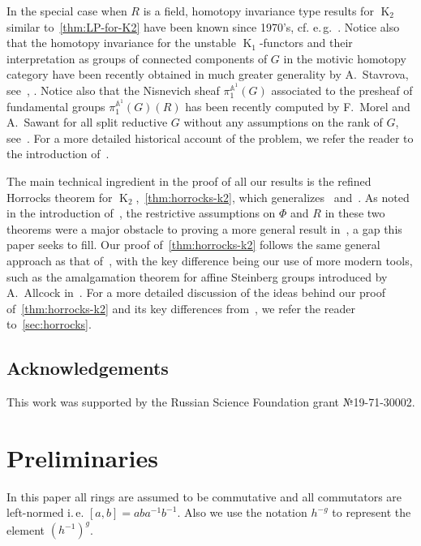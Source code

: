 \documentclass[oneside, 10pt]{amsart}
\DeclareMathOperator{\K}{K}
\numberwithin{equation}{section}
\numberwithin{thm}{section}
\numberwithin{lemma}{section}
\theoremstyle{definition}
\theoremstyle{remark}
\begin{document}
In the special case when $R$ is a field, homotopy invariance type results for $\K_2$ similar to~\cref{thm:LP-for-K2} have been known since 1970's, cf. e.\,g.~\cite{Hur77, Re75, VW16}.
Notice also that the homotopy invariance for the unstable $\K_1$-functors and their interpretation as groups of connected components of $G$ in the motivic homotopy category
have been recently obtained in much greater generality by A.~Stavrova, see~\cite[Theorem~1.3]{St-poly}, \cite[Theorem~5.2]{St22}.
Notice also that the Nisnevich sheaf $\pi_1^{\mathbb{A}^1}(G)$ associated to the presheaf of fundamental groups $\pi_1^{\mathbb{A}^1}(G)(R)$
has been recently computed by F.~Morel and A.~Sawant for all split reductive $G$ without any assumptions on the rank of $G$, see~\cite[Theorem~1]{MS23}.
For a more detailed historical account of the problem, we refer the reader to the introduction of~\cite{LSV2}.

The main technical ingredient in the proof of all our results is the refined Horrocks theorem for $\K_2$,~\cref{thm:horrocks-k2},
which generalizes~\cite[Theorem~1]{LS20} and~\cite[Proposition~4.3]{Tu83}.
As noted in the introduction of~\cite{LSV2}, the restrictive assumptions on $\Phi$ and $R$ in these two theorems were a major obstacle to proving a more
general result in~\cite{LSV2}, a gap this paper seeks to fill.
Our proof of~\cref{thm:horrocks-k2} follows the same general approach as that of~\cite[Proposition~4.3]{Tu83},
with the key difference being our use of more modern tools, such as the amalgamation theorem for affine Steinberg groups introduced by A.~Allcock in~\cite{A13}.
For a more detailed discussion of the ideas behind our proof of~\cref{thm:horrocks-k2} and its key differences from~\cite{LS20, Tu83}, we refer the reader to~\cref{sec:horrocks}.


\subsection{Acknowledgements}
This work was supported by the Russian Science Foundation grant №19-71-30002.

\section{Preliminaries}\label{sec:preliminaries}

In this paper all rings are assumed to be commutative and all commutators are left-normed i.\,e. $[a, b] = a b a^{-1} b^{-1}$.
Also we use the notation $h^{-g}$ to represent the element $(h^{-1})^g$.
\end{document}
